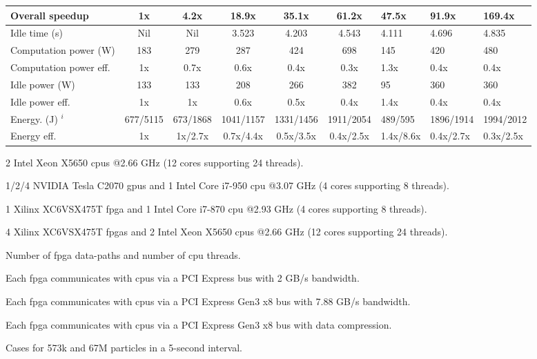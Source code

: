\begin{table}[ht]
\begin{spacing}{1.0}
\begin{threeparttable}
\begin{tabular}{l || c c c c c g g g}
		Overall speedup  						& 1x							& 4.2x	 					& 18.9x						& 35.1x						& 61.2x						& 47.5x 	& 91.9x		& 169.4x	\\
		\hline
		Idle time (s)				&	Nil						& Nil					& 3.523					& 4.203					& 4.543				& 4.111							& 4.696		& 4.835 \\
		\hline
		Computation power (W) 	   					& 183							& 279 						& 287  						& 424						& 698						& 145 		& 420		& 480		\\
		Computation power eff.						& 1x							& 0.7x						& 0.6x 						& 0.4x						& 0.3x						& 1.3x 		& 0.4x 		& 0.4x		\\
		Idle power (W)    						& 133							& 133						& 208   					& 266 						& 382						& 95		& 360		& 360		\\
		Idle power eff.					    	& 1x							& 1x						& 0.6x	 					& 0.5x						& 0.4x						& 1.4x 	& 0.4x		& 0.4x		\\
		\hline
		Energy. (J) $^i$						& 677/5115						& 673/1868 					& 1041/1157 				& 1331/1456					& 1911/2054					& 489/595 	& 1896/1914	& 1994/2012	\\
		Energy eff.							& 1x							& 1x/2.7x 					& 0.7x/4.4x 				& 0.5x/3.5x 				& 0.4x/2.5x					& 1.4x/8.6x	& 0.4x/2.7x	& 0.3x/2.5x\\
		\hline
		\end{tabular}
			\begin{tablenotes}
			\item[a] 2 Intel Xeon X5650 \glspl{cpu} @2.66 GHz (12 cores supporting 24 threads).
			\item[b] 1/2/4 NVIDIA Tesla C2070 \gls{gpu}s and 1 Intel Core i7-950 \gls{cpu} @3.07 GHz (4 cores supporting 8 threads).
			\item[c] 1 Xilinx XC6VSX475T \gls{fpga} and 1 Intel Core i7-870 \gls{cpu} @2.93 GHz (4 cores supporting 8 threads).
			\item[d] 4 Xilinx XC6VSX475T \glspl{fpga} and 2 Intel Xeon X5650 \glspl{cpu} @2.66 GHz (12 cores supporting 24 threads).
			\item[e] Number of \gls{fpga} data-paths and number of \gls{cpu} threads.
			\item[f] Each \gls{fpga} communicates with \glspl{cpu} via a PCI Express bus with 2 GB/s bandwidth.
			\item[g] Each \gls{fpga} communicates with \glspl{cpu} via a PCI Express Gen3 x8 bus with 7.88 GB/s bandwidth.
			\item[h] Each \gls{fpga} communicates with \glspl{cpu} via a PCI Express Gen3 x8 bus with data compression.
			\item[i] Cases for 573k and 67M particles in a 5-second interval.
			\end{tablenotes}
		\end{threeparttable}
\end{spacing}
\end{table}

